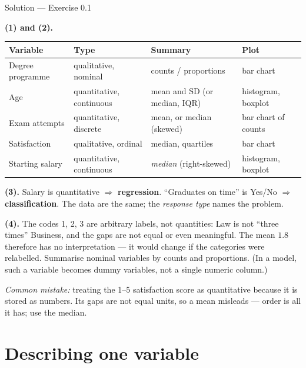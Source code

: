 \documentclass[aspectratio=169,11pt]{beamer}
\begin{document}
\begin{frame}{Solution --- Exercise 0.1}
  \begin{solutionbox}
    \scriptsize
    \textbf{(1) and (2).}
    \begin{center}\scriptsize
    \begin{tabular}{@{}llll@{}}
      \toprule
      \textbf{Variable} & \textbf{Type} & \textbf{Summary} & \textbf{Plot} \\
      \midrule
      Degree programme & qualitative, nominal & counts / proportions & bar chart \\
      Age & quantitative, continuous & mean and SD (or median, IQR) & histogram, boxplot \\
      Exam attempts & quantitative, discrete & mean, or median (skewed) & bar chart of counts \\
      Satisfaction & qualitative, ordinal & median, quartiles & bar chart \\
      Starting salary & quantitative, continuous & \emph{median} (right-skewed) & histogram, boxplot \\
      \bottomrule
    \end{tabular}
    \end{center}
    \textbf{(3).} Salary is quantitative $\Rightarrow$ \textbf{regression}.
    ``Graduates on time'' is Yes/No $\Rightarrow$ \textbf{classification}.
    The data are the same; the \emph{response type} names the problem.

    \textbf{(4).} The codes 1, 2, 3 are arbitrary labels, not quantities:
    Law is not ``three times'' Business, and the gaps are not equal or even
    meaningful. The mean $1.8$ therefore has no interpretation --- it would
    change if the categories were relabelled. Summarise nominal variables by
    counts and proportions. (In a model, such a variable becomes dummy
    variables, not a single numeric column.)

    \textit{Common mistake:} treating the 1--5 satisfaction score as
    quantitative because it is stored as numbers. Its gaps are not equal
    units, so a mean misleads --- order is all it has; use the median.
  \end{solutionbox}
\end{frame}


\section[One variable]{Describing one variable}
\end{document}
